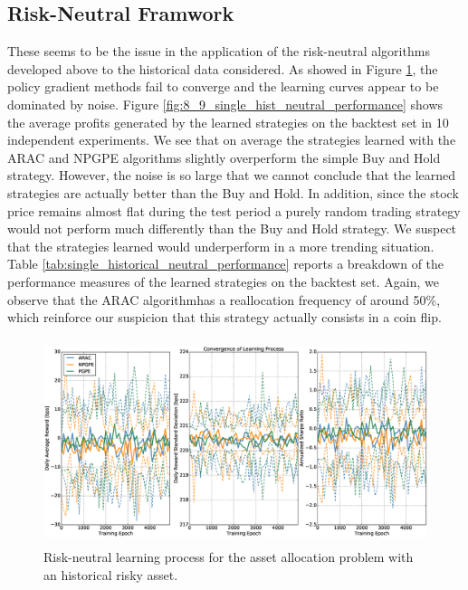 \subsection{Risk-Neutral Framwork}
These seems to be the issue in the application of the risk-neutral algorithms developed above to the historical data considered. As showed in Figure \ref{fig:8_8_rn_learning_process_historical}, the policy gradient methods fail to converge and the learning curves appear to be dominated by noise. Figure \ref{fig:8_9_single_hist_neutral_performance} shows the average profits generated by the learned strategies on the backtest set in 10 independent experiments. We see that on average the strategies learned with the ARAC and NPGPE algorithms slightly overperform the simple Buy and Hold strategy. However, the noise is so large that we cannot conclude that the learned strategies are actually better than the Buy and Hold. In addition, since the stock price remains almost flat during the test period a purely random trading strategy would not perform much differently than the Buy and Hold strategy. We suspect that the strategies learned would underperform in a more trending situation. Table \ref{tab:single_historical_neutral_performance} reports a breakdown of the performance measures of the learned strategies on the backtest set. Again, we observe that the ARAC algorithmhas a reallocation frequency of around 50\%, which reinforce our suspicion that this strategy actually consists in a coin flip. 

\begin{figure}[t!]
	\centering
	\includegraphics[height=6cm,width=1.0\textwidth]{Images/8_8_single_hist_neutral_convergence}
	\caption[Risk-neutral learning process for the historical risky asset]{Risk-neutral learning process for the asset allocation problem with an historical risky asset.}
	\label{fig:8_8_rn_learning_process_historical}
\end{figure}

